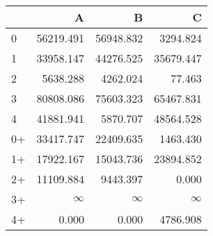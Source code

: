 \begin{tabular}{lrrr}
\toprule
     &         A &         B &         C \\
\midrule
 0   & \num{56219.491} & \num{56948.832} &  \num{3294.824} \\
 1   & \num{33958.147} & \num{44276.525} & \num{35679.447} \\
 2   &  \num{5638.288} &  \num{4262.024} &    \num{77.463} \\
 3   & \num{80808.086} & \num{75603.323} & \num{65467.831} \\
 4   & \num{41881.941} &  \num{5870.707} & \num{48564.528} \\
 0+  & \num{33417.747} & \num{22409.635} &  \num{1463.430} \\
 1+  & \num{17922.167} & \num{15043.736} & \num{23894.852} \\
 2+  & \num{11109.884} &  \num{9443.397} &     \num{0.000} \\
 3+  &  $\infty$    &  $\infty$    &  $\infty$    \\
 4+  &     \num{0.000} &     \num{0.000} &  \num{4786.908} \\
\bottomrule
\end{tabular}